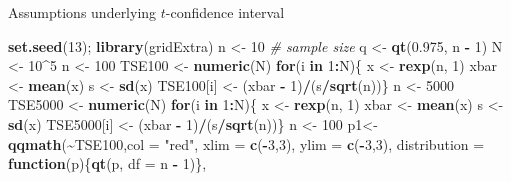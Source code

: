 \documentclass[
  ignorenonframetext,
]{beamer}
\newenvironment{Shaded}{\begin{snugshade}}{\end{snugshade}}
\newcommand{\AttributeTok}[1]{\textcolor[rgb]{0.13,0.29,0.53}{#1}}
\newcommand{\CommentTok}[1]{\textcolor[rgb]{0.56,0.35,0.01}{\textit{#1}}}
\newcommand{\ControlFlowTok}[1]{\textcolor[rgb]{0.13,0.29,0.53}{\textbf{#1}}}
\newcommand{\DecValTok}[1]{\textcolor[rgb]{0.00,0.00,0.81}{#1}}
\newcommand{\FloatTok}[1]{\textcolor[rgb]{0.00,0.00,0.81}{#1}}
\newcommand{\FunctionTok}[1]{\textcolor[rgb]{0.13,0.29,0.53}{\textbf{#1}}}
\newcommand{\NormalTok}[1]{#1}
\newcommand{\OtherTok}[1]{\textcolor[rgb]{0.56,0.35,0.01}{#1}}
\newcommand{\SpecialCharTok}[1]{\textcolor[rgb]{0.81,0.36,0.00}{\textbf{#1}}}
\newcommand{\StringTok}[1]{\textcolor[rgb]{0.31,0.60,0.02}{#1}}
\begin{document}
\begin{frame}[fragile]{Assumptions underlying \(t\)-confidence interval}
\protect\hypertarget{assumptions-underlying-t-confidence-interval-7}{}
\tiny

\begin{Shaded}
\begin{Highlighting}[]
\FunctionTok{set.seed}\NormalTok{(}\DecValTok{13}\NormalTok{); }\FunctionTok{library}\NormalTok{(gridExtra)}
\NormalTok{n }\OtherTok{\textless{}{-}} \DecValTok{10}           \CommentTok{\# sample size}
\NormalTok{q }\OtherTok{\textless{}{-}} \FunctionTok{qt}\NormalTok{(}\FloatTok{0.975}\NormalTok{, n }\SpecialCharTok{{-}} \DecValTok{1}\NormalTok{)}
\NormalTok{N }\OtherTok{\textless{}{-}} \DecValTok{10}\SpecialCharTok{\^{}}\DecValTok{5}
\NormalTok{n }\OtherTok{\textless{}{-}} \DecValTok{100}
\NormalTok{TSE100 }\OtherTok{\textless{}{-}} \FunctionTok{numeric}\NormalTok{(N)}
\ControlFlowTok{for}\NormalTok{(i }\ControlFlowTok{in} \DecValTok{1}\SpecialCharTok{:}\NormalTok{N)\{}
\NormalTok{  x }\OtherTok{\textless{}{-}} \FunctionTok{rexp}\NormalTok{(n, }\DecValTok{1}\NormalTok{)}
\NormalTok{  xbar }\OtherTok{\textless{}{-}} \FunctionTok{mean}\NormalTok{(x)}
\NormalTok{  s }\OtherTok{\textless{}{-}} \FunctionTok{sd}\NormalTok{(x)}
\NormalTok{  TSE100[i] }\OtherTok{\textless{}{-}}\NormalTok{ (xbar }\SpecialCharTok{{-}} \DecValTok{1}\NormalTok{)}\SpecialCharTok{/}\NormalTok{(s}\SpecialCharTok{/}\FunctionTok{sqrt}\NormalTok{(n))\}}
\NormalTok{n }\OtherTok{\textless{}{-}} \DecValTok{5000}
\NormalTok{TSE5000 }\OtherTok{\textless{}{-}} \FunctionTok{numeric}\NormalTok{(N)}
\ControlFlowTok{for}\NormalTok{(i }\ControlFlowTok{in} \DecValTok{1}\SpecialCharTok{:}\NormalTok{N)\{}
\NormalTok{  x }\OtherTok{\textless{}{-}} \FunctionTok{rexp}\NormalTok{(n, }\DecValTok{1}\NormalTok{)}
\NormalTok{  xbar }\OtherTok{\textless{}{-}} \FunctionTok{mean}\NormalTok{(x)}
\NormalTok{  s }\OtherTok{\textless{}{-}} \FunctionTok{sd}\NormalTok{(x)}
\NormalTok{  TSE5000[i] }\OtherTok{\textless{}{-}}\NormalTok{ (xbar }\SpecialCharTok{{-}} \DecValTok{1}\NormalTok{)}\SpecialCharTok{/}\NormalTok{(s}\SpecialCharTok{/}\FunctionTok{sqrt}\NormalTok{(n))\}}
\NormalTok{n }\OtherTok{\textless{}{-}} \DecValTok{100}
\NormalTok{p1}\OtherTok{\textless{}{-}}\FunctionTok{qqmath}\NormalTok{(}\SpecialCharTok{\textasciitilde{}}\NormalTok{TSE100,}\AttributeTok{col =} \StringTok{"red"}\NormalTok{, }\AttributeTok{xlim =} \FunctionTok{c}\NormalTok{(}\SpecialCharTok{{-}}\DecValTok{3}\NormalTok{,}\DecValTok{3}\NormalTok{), }\AttributeTok{ylim =} \FunctionTok{c}\NormalTok{(}\SpecialCharTok{{-}}\DecValTok{3}\NormalTok{,}\DecValTok{3}\NormalTok{), }\AttributeTok{distribution =} \ControlFlowTok{function}\NormalTok{(p)\{}\FunctionTok{qt}\NormalTok{(p, }\AttributeTok{df =}\NormalTok{ n }\SpecialCharTok{{-}} \DecValTok{1}\NormalTok{)\}, }

\end{Highlighting}
\end{Shaded}
\end{frame}
\end{document}
